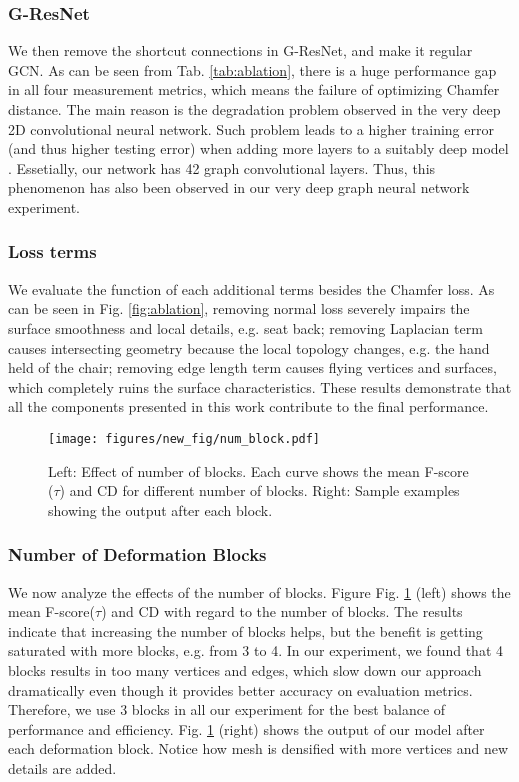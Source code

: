 \documentclass[runningheads]{llncs}
\newcommand{\figref}[1]{Fig. \ref{#1}}
\newcommand{\tabref}[1]{Tab. \ref{#1}}
\begin{document}
\subsubsection{G-ResNet}
We then remove the shortcut connections in G-ResNet, and make it regular GCN. As can be seen from \tabref{tab:ablation}, there is a huge performance gap in all four measurement metrics, which means the failure of optimizing Chamfer distance. The main reason is the degradation problem observed in the very deep 2D convolutional neural network. Such problem leads to a higher training error (and thus higher testing error) when adding more layers to a suitably deep model \cite{HeZRS16}. Essetially, our network has 42 graph convolutional layers. Thus, this phenomenon has also been observed in our very deep graph neural network experiment.

\subsubsection{Loss terms}
We evaluate the function of each additional terms besides the Chamfer loss. As can be seen in \figref{fig:ablation}, removing normal loss severely impairs the surface smoothness and local details, e.g. seat back; removing Laplacian term causes intersecting geometry because the local topology changes, e.g. the hand held of the chair; removing edge length term causes flying vertices and surfaces, which completely ruins the surface characteristics.
These results demonstrate that all the components presented in this work contribute to the final performance.









\begin{figure}[tbhp]
\centering
\texttt{[image: figures/new\_fig/num\_block.pdf]}
\caption{Left: Effect of number of blocks. Each curve shows the mean F-score ($\tau$) and CD for different number of blocks. Right: Sample examples showing the output after each block.}
\label{fig:num_block}
\end{figure} 

\subsubsection{Number of Deformation Blocks}
We now analyze the effects of the number of blocks. Figure \figref{fig:num_block} (left) shows the mean F-score($\tau$) and CD with regard to the number of blocks. The results indicate that increasing the number of blocks helps, but the benefit is getting saturated with more blocks, e.g. from 3 to 4. In our experiment, we found that 4 blocks results in too many vertices and edges, which slow down our approach dramatically even though it provides better accuracy on evaluation metrics. Therefore, we use 3 blocks in all our experiment for the best balance of performance and efficiency. 
\figref{fig:num_block} (right) shows the output of our model after each deformation block. Notice how mesh is densified with more vertices and new details are added.
\end{document}
